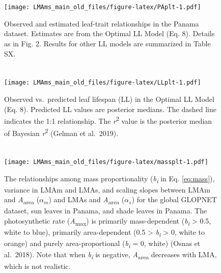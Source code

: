 \documentclass[
  12pt,
]{article}
\begin{document}
\newpage

\hypertarget{section-3}{%
\section{}\label{section-3}}

\begin{figure}
\centering
\texttt{[image: LMAms\_main\_old\_files/figure-latex/PAplt-1.pdf]}
\caption{\label{fig:PAplt}Observed and estimated leaf-trait relationships in the Panama dataset. Estimates are from the Optimal LL Model (Eq. 8). Details as in Fig. 2. Results for other LL models are summarized in Table SX.}
\end{figure}

\newpage

\hypertarget{section-4}{%
\section{}\label{section-4}}

\begin{figure}
\centering
\texttt{[image: LMAms\_main\_old\_files/figure-latex/LLplt-1.pdf]}
\caption{\label{fig:LLplt}Observed vs.~predicted leaf lifespan (LL) in the Optimal LL Model (Eq. 8). Predicted LL values are posterior medians. The dashed line indicates the 1:1 relationship. The \emph{r}\textsuperscript{2} value is the posterior median of Bayesian \emph{r}\textsuperscript{2} (Gelman et al.~2019).}
\end{figure}

\newpage

\hypertarget{section-5}{%
\section{}\label{section-5}}

\begin{figure}
\centering
\texttt{[image: LMAms\_main\_old\_files/figure-latex/massplt-1.pdf]}
\caption{\label{fig:massplt}The relationships among mass proportionality (\emph{b\textsubscript{i}} in Eq. \eqref{eq:mass}), variance in LMAm and LMAs, and scaling slopes between LMAm and \emph{A}\textsubscript{area} (\(\alpha_m\)) and LMAs and \emph{A}\textsubscript{area} (\(\alpha_s\)) for the global GLOPNET dataset, sun leaves in Panama, and shade leaves in Panama. The photosynthetic rate (\emph{A}\textsubscript{max}) is primarily mass-dependent (\emph{b\textsubscript{i}} \textgreater{} 0.5, white to blue), primarily area-dependent (0.5 \textgreater{} \emph{b\textsubscript{i}} \textgreater{} 0, white to orange) and purely area-proportional (\emph{b\textsubscript{i}} = 0, white) (Osnas et al.~2018). Note that when \emph{b\textsubscript{i}} is negative, \emph{A}\textsubscript{area} decreases with LMA, which is not realistic.}
\end{figure}
\end{document}
